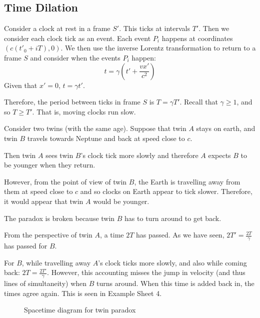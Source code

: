 \documentclass[../Main.tex]{subfiles}
\begin{document}
\subsection{Time Dilation}
Consider a clock at rest in a frame $S'$. This ticks at intervals $T'$. Then we consider each clock tick as an event. Each event $P_i$ happens at coordinates $(c(t'_0 + iT), 0)$. We then use the inverse Lorentz transformation to return to a frame $S$ and consider when the events $P_i$ happen:
\begin{equation*}
    t = \gamma(t' + \frac{vx'}{c^2})
\end{equation*}
Given that $x' = 0$, $t = \gamma t'$.\par
Therefore, the period between ticks in frame $S$ is $T = \gamma T'$. Recall that $\gamma \geq 1$, and so $T \geq T'$. That is, moving clocks run slow.
\begin{example}
    Consider two twins (with the same age). Suppose that twin $A$ stays on earth, and twin $B$ travels towards Neptune and back at speed close to $c$.\par
    Then twin $A$ sees twin $B$'s clock tick more slowly and therefore $A$ expects $B$ to be younger when they return.\par
    However, from the point of view of twin $B$, the Earth is travelling away from them at speed close to $c$ and so clocks on Earth appear to tick slower. Therefore, it would appear that twin $A$ would be younger.\par
    The paradox is broken because twin $B$ has to turn around to get back.\par
    From the perspective of twin $A$, a time $2T$ has passed. As we have seen, $2T' = \frac{2T}{\gamma}$ has passed for $B$.\par
    For $B$, while travelling away $A$'s clock ticks more slowly, and also while coming back: $2T = \frac{2T'}{\gamma}$. However, this accounting misses the jump in velocity (and thus lines of simultaneity) when $B$ turns around. When this time is added back in, the times agree again. This is seen in Example Sheet 4.
\end{example}
\begin{figure}[ht]
    \centering
    \caption{Spacetime diagram for twin paradox}
    \label{figTwinParadox}
\end{figure}
\end{document}
